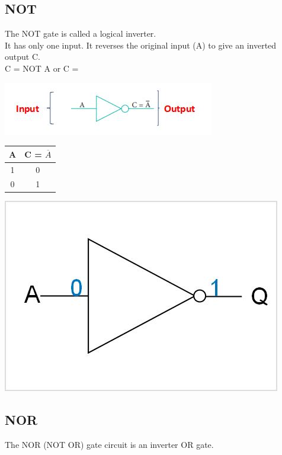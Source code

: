 \documentclass{article}
\begin{document}
\subsection{NOT}
The NOT gate is called a logical inverter. \\
It has only one input. It reverses the original input (A) to give an inverted output C. \\

\color{red}C = NOT A or C = \\ \color{black}
\begin{center}
	\includegraphics{10}
\end{center}
\begin{table}[h!]
	\begin{center}
		\begin{tabular}{c|c}
			\textbf{A} & 
			\textbf{C = $\overline{A}$}\\
			\hline
			\cellcolor{blue!20}1 & \cellcolor{blue!20}0 \\
			\hline
			\cellcolor{blue!30}0 & \cellcolor{blue!30}1 \\
			\hline
		\end{tabular}
	\end{center}
\end{table} 
\begin{center}
	\includegraphics{12}
\end{center}

\subsection{NOR}
The NOR (NOT OR) gate circuit is an inverter OR gate. \\
\end{document}
